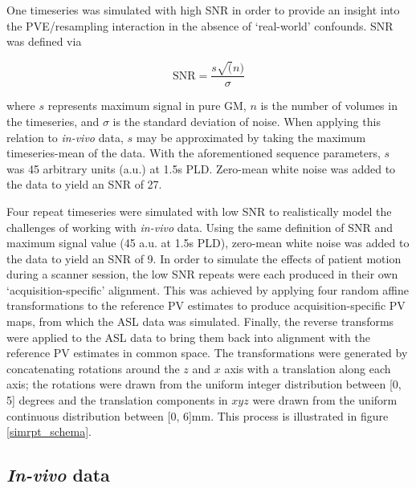 \documentclass[12pt]{report}
\begin{document}
One timeseries was simulated with high SNR in order to provide an insight into the PVE/resampling interaction in the absence of `real-world' confounds. SNR was defined via 

\begin{equation}
\label{snr_defn}
\mathrm{SNR} = \frac{s \sqrt(n)}{\sigma}
\end{equation}

where $s$ represents maximum signal in pure GM, $n$ is the number of volumes in the timeseries, and $\sigma$ is the standard deviation of noise. When applying this relation to \textit{in-vivo} data, $s$ may be approximated by taking the maximum timeseries-mean of the data. With the aforementioned sequence parameters, $s$ was 45 arbitrary units (a.u.) at 1.5s PLD. Zero-mean white noise was added to the data to yield an SNR of 27. 

Four repeat timeseries were simulated with low SNR to realistically model the challenges of working with \textit{in-vivo} data. Using the same definition of SNR and maximum signal value (45 a.u. at 1.5s PLD), zero-mean white noise was added to the data to yield an SNR of 9. In order to simulate the effects of patient motion during a scanner session, the low SNR repeats were each produced in their own `acquisition-specific' alignment. This was achieved by applying four random affine transformations to the reference PV estimates to produce acquisition-specific PV maps, from which the ASL data was simulated. Finally, the reverse transforms were applied to the ASL data to bring them back into alignment with the reference PV estimates in common space. The transformations were generated by concatenating rotations around the $z$ and $x$ axis with a translation along each axis; the rotations were drawn from the uniform integer distribution between [0, 5] degrees and the translation components in $xyz$ were drawn from the uniform continuous distribution between [0, 6]mm. This process is illustrated in figure \ref{simrpt_schema}. 

\subsection{\textit{In-vivo} data}
\end{document}
